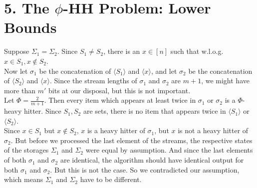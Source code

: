 \documentclass{article}
\begin{document}
\section*{5. The $\phi$-HH Problem: Lower Bounds}
Suppose $\Sigma_1 = \Sigma_2$. Since $S_1 \neq S_2$, there is an $x \in [n]$
such that w.l.o.g. $x \in S_1, x \notin S_2$. \\

Now let $\sigma_1$ be the concatenation of $\langle S_1 \rangle$ and $\langle x \rangle$,
and let $\sigma_2$ be the concatenation of $\langle S_2 \rangle$ and $\langle x \rangle$.
Since the stream lengths of $\sigma_1$ and $\sigma_2$ are $m+1$, we might have more than $m'$ bits at our disposal, but this is not important. \\

Let $\Phi = \frac{2}{m+1}$. Then every item which appears at least twice in $\sigma_1$ or $\sigma_2$ is a $\Phi$-heavy hitter.
Since $S_1, S_2$ are sets, there is no item that appears twice in $\langle S_1 \rangle$ or $\langle S_2 \rangle$. \\

Since $x \in S_1$ but $x \notin S_2$, $x$ is a heavy hitter of $\sigma_1$, but $x$ is not a heavy hitter of $\sigma_2$.
But before we processed the last element of the streams, the respective states of the storages $\Sigma_1$ and $\Sigma_2$ were equal by assumption.
And since the last elements of both $\sigma_1$ and $\sigma_2$ are identical, the algorithm should have identical output for both $\sigma_1$ and $\sigma_2$. But this is not the case.
So we contradicted our assumption, which means $\Sigma_1$ and $\Sigma_2$ have to be different.
\end{document}
